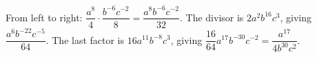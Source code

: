 From left to right: $\dfrac{a^8}{4}\cdot\dfrac{b^{-6}c^{-2}}{8}=\dfrac{a^8b^{-6}c^{-2}}{32}$. The divisor is $2a^2b^{16}c^3$, giving $\dfrac{a^6b^{-22}c^{-5}}{64}$. The last factor is $16a^{11}b^{-8}c^3$, giving $\dfrac{16}{64}a^{17}b^{-30}c^{-2}=\boxed{\dfrac{a^{17}}{4b^{30}c^2}}$.
